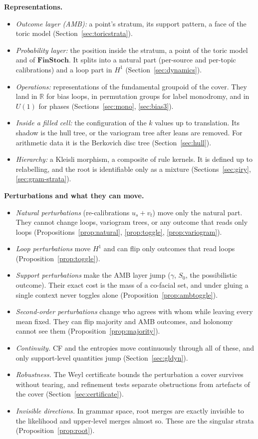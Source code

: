 \documentclass[11pt]{article}
\theoremstyle{definition}
\theoremstyle{remark}
\newcommand{\R}{\mathbb{R}}
\begin{document}
\textbf{Representations.}
\begin{itemize}
  \item \emph{Outcome layer (AMB):} a point's stratum, its support pattern, a face of the toric model (Section~\ref{sec:toricstrata}).
  \item \emph{Probability layer:} the position inside the stratum, a point of the toric model and of $\mathbf{FinStoch}$. It splits into a natural part (per-source and per-topic calibrations) and a loop part in $H^1$ (Section~\ref{sec:dynamics}).
  \item \emph{Operations:} representations of the fundamental groupoid of the cover. They land in $\R$ for bias loops, in permutation groups for label monodromy, and in $U(1)$ for phases (Sections~\ref{sec:mono}, \ref{sec:bias3}).
  \item \emph{Inside a filled cell:} the configuration of the $k$ values up to translation. Its shadow is the hull tree, or the variogram tree after leans are removed. For arithmetic data it is the Berkovich disc tree (Section~\ref{sec:hull}).
  \item \emph{Hierarchy:} a Kleisli morphism, a composite of rule kernels. It is defined up to relabelling, and the root is identifiable only as a mixture (Sections~\ref{sec:giry}, \ref{sec:gram-strata}).
\end{itemize}

\textbf{Perturbations and what they can move.}
\begin{itemize}
  \item \emph{Natural perturbations} (re-calibrations $u_s+v_t$) move only the natural part. They cannot change loops, variogram trees, or any outcome that reads only loops (Propositions~\ref{prop:natural}, \ref{prop:toggle}, \ref{prop:variogram}).
  \item \emph{Loop perturbations} move $H^1$ and can flip only outcomes that read loops (Proposition~\ref{prop:toggle}).
  \item \emph{Support perturbations} make the AMB layer jump ($\gamma$, $S_0$, the possibilistic outcome). Their exact cost is the mass of a co-facial set, and under gluing a single context never toggles alone (Proposition~\ref{prop:ambtoggle}).
  \item \emph{Second-order perturbations} change who agrees with whom while leaving every mean fixed. They can flip majority and AMB outcomes, and holonomy cannot see them (Proposition~\ref{prop:majority}).
  \item \emph{Continuity.} CF and the entropies move continuously through all of these, and only support-level quantities jump (Section~\ref{sec:gldyn}).
  \item \emph{Robustness.} The Weyl certificate bounds the perturbation a cover survives without tearing, and refinement tests separate obstructions from artefacts of the cover (Section~\ref{sec:certificate}).
  \item \emph{Invisible directions.} In grammar space, root merges are exactly invisible to the likelihood and upper-level merges almost so. These are the singular strata (Proposition~\ref{prop:root}).
\end{itemize}
\end{document}
